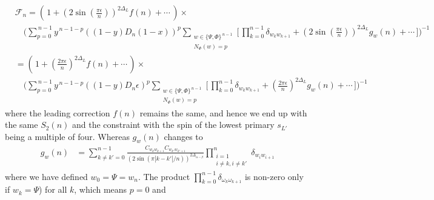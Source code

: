 \documentclass[11pt]{article}
\newcommand{\ep}{\epsilon}
\newcommand{\nn}{\nonumber}
\newcommand{\lb}{\left(}
\newcommand{\rb}{\right)}
\begin{document}
\begin{align}\label{eq:F_n_1_minus_x_mixed}
    &\mathcal{F}_{n}
    =\lb \,1+\lb 2\sin\lb\frac{\pi \ep}{n}\rb\rb^{2\Delta_L}f(n)+\cdots\,\rb\times 
    \nn\\
    &\quad\Bigg(\sum_{p=0}^{\,n-1}y^{\,n-1-p}((1-y)D_n(1-x))^{p}\sum_{\substack{w\in\{\Psi,\Phi\}^{\,n-1}\\ N_\Phi(w)=p}}\Big[\,\prod_{k=0}^{n-1}\delta_{w_kw_  {k+1}}+\lb 2\sin\lb\frac{\pi \ep}{n}\rb\rb^{2\Delta_L}g_{w}(n)+\cdots\,\Big]\Bigg)^{-1}
    \nn\\
    &=\lb\,1+\lb\frac{2\pi \ep}{n}\rb^{2\Delta_L}f(n)+\cdots\,\rb\times
    \nn\\
    &\quad\Bigg(\sum_{p=0}^{\,n-1}y^{\,n-1-p}((1-y) D_n\ep)^{p}\sum_{\substack{w\in\{\Psi,\Phi\}^{\,n-1}\\ N_\Phi(w)=p}}\Big[\,\prod_{k=0}^{n-1}\delta_{w_kw_  {k+1}}+\lb\frac{2\pi \ep}{n}\rb^{2\Delta_L}g_{w}(n)+\cdots\,\Big]\Bigg)^{-1}
    \end{align}
  where the leading correction $f(n)$ remains the same, and hence we end up with the same $S_{2}(n)$ and the constraint with the spin of the lowest primary $s_{L'}$ being a multiple of four. Whereas $g_{w}(n)$ changes to
  \begin{align}\label{gnw_1_minus_x_mixed}
    g_{w}(n)&=\sum_{k\neq k'=0}^{n-1}\frac{C_{w_kw_{k+1}}C_{w_{k'}w_{k'+1}}}{(2\sin(\pi |k-k'|/n))^{2\Delta_{\alpha-\beta}}}\prod_{\substack{i=1\\i\neq k,i\neq k'}}^n  \delta_{w_i w_{i+1}} \nn
  \end{align}  
  where we have defined $w_0=\Psi=w_n$. The product $\prod_{k=0}^{n-1}\delta_{\omega_k\omega_{k+1}}$ is non-zero only if $w_k=\Psi$) for all $k$, which means $p=0$ and 
\end{document}
